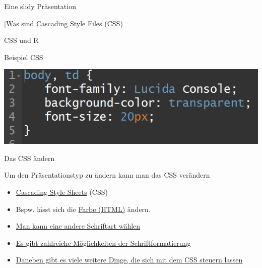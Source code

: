 \documentclass[ignorenonframetext,]{beamer}
\begin{document}
\begin{frame}{Eine slidy Präsentation}
\begin{block}{{[}Was sind Cascading Style Files
(\href{https://de.wikipedia.org/wiki/Cascading_Style_Sheets}{CSS})}
\begin{block}{CSS und R}
\end{block}

\end{block}

\begin{block}{Beispiel CSS}

\includegraphics{./tex2pdf.9796/7df24f613cbd3ed9e521436f77e2923e64260c99.png}

\end{block}

\begin{block}{Das CSS ändern}

Um den Präsentationstyp zu ändern kann man das CSS verändern

\begin{itemize}
\item
  \href{https://de.wikipedia.org/wiki/Cascading_Style_Sheets}{Cascading
  Style Sheets} (CSS)
\item
  Bspw. lässt sich die \href{http://tomheller.de/html-farben.html}{Farbe
  (HTML)} ändern.
\item
  \href{https://www.mediaevent.de/css/font-family.html}{Man kann eine
  andere Schriftart wählen}
\item
  \href{https://wiki.selfhtml.org/wiki/CSS/Eigenschaften/Schriftformatierung}{Es
  gibt zahlreiche Möglichkeiten der Schriftformatierung}
\item
  \href{https://www.w3.org/TR/WCAG20-TECHS/C22.html}{Daneben gibt es
  viele weitere Dinge, die sich mit dem CSS steuern lassen}
\end{itemize}

\end{block}

\end{frame}
\end{document}
